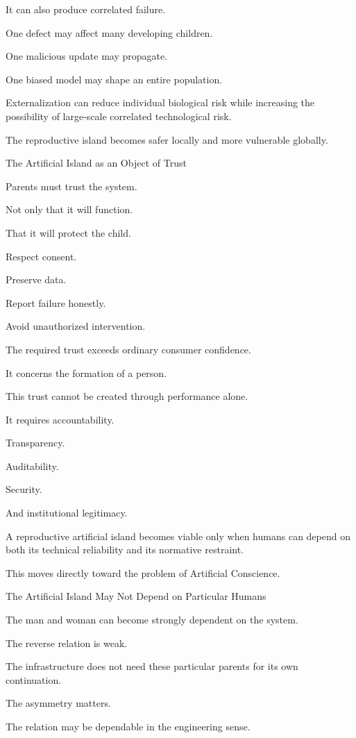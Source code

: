 It can also produce correlated failure.

One defect may affect many developing children.

One malicious update may propagate.

One biased model may shape an entire population.

Externalization can reduce individual biological risk while increasing the possibility of large-scale correlated technological risk.

The reproductive island becomes safer locally and more vulnerable globally.

The Artificial Island as an Object of Trust

Parents must trust the system.

Not only that it will function.

That it will protect the child.

Respect consent.

Preserve data.

Report failure honestly.

Avoid unauthorized intervention.

The required trust exceeds ordinary consumer confidence.

It concerns the formation of a person.

This trust cannot be created through performance alone.

It requires accountability.

Transparency.

Auditability.

Security.

And institutional legitimacy.

A reproductive artificial island becomes viable only when humans can depend on both its technical reliability and its normative restraint.

This moves directly toward the problem of Artificial Conscience.

The Artificial Island May Not Depend on Particular Humans

The man and woman can become strongly dependent on the system.

The reverse relation is weak.

The infrastructure does not need these particular parents for its own continuation.

The asymmetry matters.

The relation may be dependable in the engineering sense.

